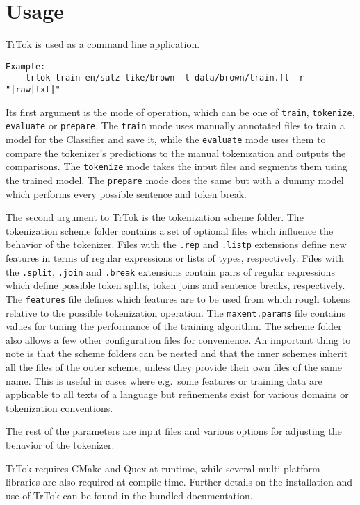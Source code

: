 \section{Usage}
\label{sec:usage}

TrTok is used as a command line application.

\begin{verbatim}
Example:
    trtok train en/satz-like/brown -l data/brown/train.fl -r "|raw|txt|"
\end{verbatim}

Its first argument is the mode of operation, which can be one of
\texttt{train}, \texttt{tokenize}, \texttt{evaluate} or
\texttt{prepare}. The \texttt{train} mode uses manually annotated
files to train a model for the Classifier and save it, while the
\texttt{evaluate} mode uses them to compare the tokenizer's
predictions to the manual tokenization and outputs the comparisons.
The \texttt{tokenize} mode takes the input files and segments them
using the trained model. The \texttt{prepare} mode does the same but
with a dummy model which performs every possible sentence and token
break.

The second argument to TrTok is the tokenization scheme folder. The
tokenization scheme folder contains a set of optional files which
influence the behavior of the tokenizer. Files with the \texttt{.rep}
and \texttt{.listp} extensions define new features in terms of regular
expressions or lists of types, respectively. Files with the
\texttt{.split}, \texttt{.join} and \texttt{.break} extensions contain
pairs of regular expressions which define possible token splits, token
joins and sentence breaks, respectively. The \texttt{features} file
defines which features are to be used from which rough tokens relative
to the possible tokenization operation. The \texttt{maxent.params}
file contains values for tuning the performance of the training
algorithm. The scheme folder also allows a few other configuration
files for convenience. An important thing to note is that the scheme
folders can be nested and that the inner schemes inherit all the files
of the outer scheme, unless they provide their own files of the same
name. This is useful in cases where e.g.\ some features or training
data are applicable to all texts of a language but refinements exist
for various domains or tokenization conventions.

The rest of the parameters are input files and various options for
adjusting the behavior of the tokenizer.

TrTok requires CMake and Quex at runtime, while several multi-platform
libraries are also required at compile time. Further details on the
installation and use of TrTok can be found in the bundled
documentation.
